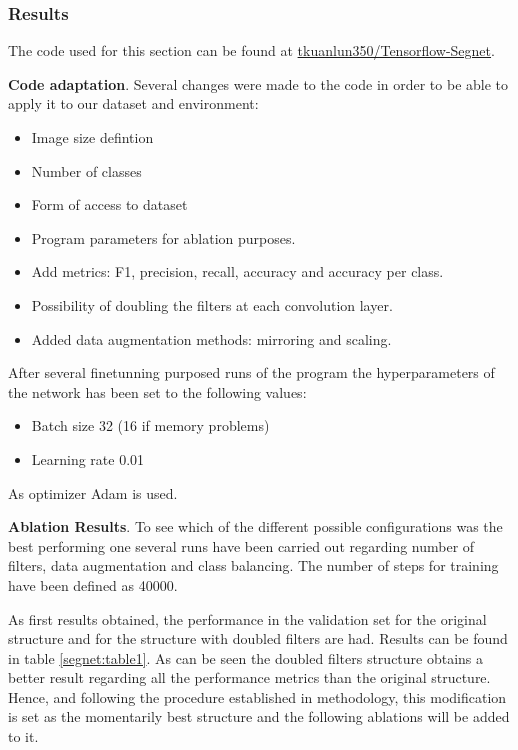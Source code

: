 \subsubsection{Results}

The code used for this section can be found at \href{https://github.com/tkuanlun350/Tensorflow-SegNet}{tkuanlun350/Tensorflow-Segnet}.\newline

\textbf{Code adaptation}. Several changes were made to the code in order to be able to apply it to our dataset and environment:

\begin{itemize}
\item Image size defintion
\item Number of classes
\item Form of access to dataset
\item Program parameters for ablation purposes.
\item Add metrics:  F1, precision, recall, accuracy and accuracy per class.
\item Possibility of doubling the filters at each convolution layer.
\item Added data augmentation methods: mirroring and scaling.
\end{itemize}

After several finetunning purposed runs of the program the hyperparameters of the network has been set to the following values:

\begin{itemize}
\item Batch size 32 (16 if memory problems)
\item Learning rate 0.01
\end{itemize}

As optimizer Adam is used.\newline

\textbf{Ablation Results}. To see which of the different possible configurations was the best performing one several runs have been carried out regarding number of filters, data augmentation and class balancing. The number of steps for training have been defined as 40000.\newline

As first results obtained,  the performance in the validation set for the original structure and for the structure with doubled filters are had. Results can be found in table \ref{segnet:table1}. As can be seen the doubled filters structure obtains a better result regarding all the performance metrics than the original structure. Hence, and following the procedure established in methodology, this modification is set as the momentarily best structure and the following ablations will be added to it.\newline

